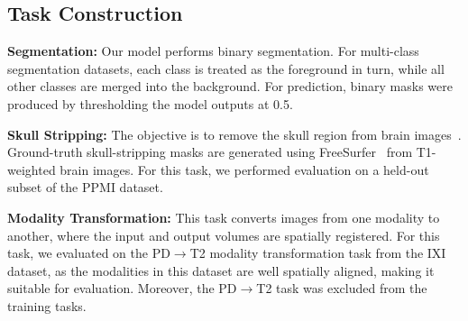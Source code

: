 \begin{table}
\centering
\renewcommand{\arraystretch}{1} %
    \caption{Sampling rate and weight for each task during training.}
\label{tab:task_sampled_weight}
\end{table}

\subsection{Task Construction}
\label{sec:tasks_sup}

\vspace{0.4em}\noindent\textbf{Segmentation:} Our model performs binary segmentation. For multi-class segmentation datasets, each class is treated as the foreground in turn, while all other classes are merged into the background.  For prediction, binary masks were produced by thresholding the model outputs at 0.5. 

\vspace{0.4em}\noindent\textbf{Skull Stripping:} The objective is to remove the skull region from brain images~\cite{hoopes2022synthstrip}. Ground-truth skull-stripping masks are generated using FreeSurfer~\cite{fischl2012freesurfer} from T1-weighted brain images. For this task, we performed evaluation on a held-out subset of the PPMI dataset.

\vspace{0.4em}\noindent\textbf{Modality Transformation:} This task converts images from one modality to another, where the input and output volumes are spatially registered. For this task, we evaluated on the PD$\rightarrow$T2 modality transformation task from the IXI dataset, as the modalities in this dataset are well spatially aligned, making it suitable for evaluation. Moreover, the PD$\rightarrow$T2 task was excluded from the training tasks.


